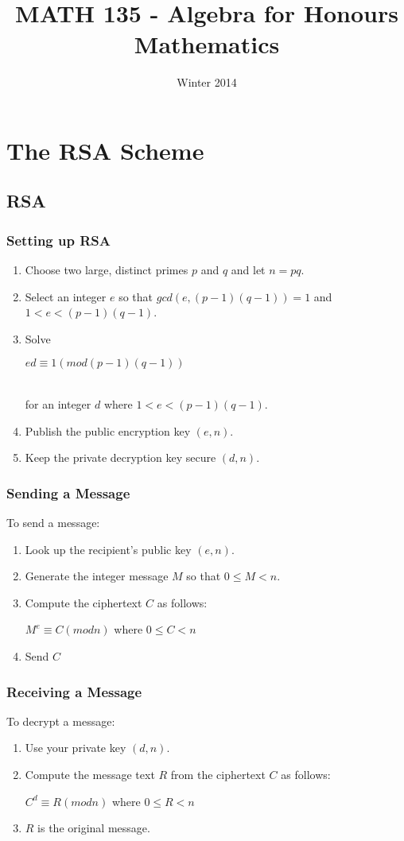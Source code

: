 \documentclass[12pt]{report}
\title{MATH 135 - Algebra for Honours Mathematics}
\author{}
\date{Winter 2014}
\begin{document}
\maketitle
\tableofcontents
\chapter{The RSA Scheme}
	\section{RSA}
		\subsection{Setting up RSA}
			\begin{enumerate}
				\item Choose two large, distinct primes $p$ and $q$ and let $n = pq$.
				\item Select an integer $e$ so that $gcd(e, (p-1)(q-1)) = 1$ and $1 < e < (p-1)(q-1)$. 
				\item Solve\\
				\centerline{$ed \equiv 1 (mod (p-1)(q-1))$}\\
				for an integer $d$ where $1 < e < (p-1)(q-1)$.
				\item Publish the public encryption key $(e,n)$.
				\item Keep the private decryption key secure $(d,n)$.
			\end{enumerate}
		\subsection{Sending a Message}
			To send a message:
			\begin{enumerate}
				\item Look up the recipient's public key $(e, n)$.
				\item Generate the integer message $M$ so that $0 \leq M < n$.
				\item Compute the ciphertext $C$ as follows:\\
					\centerline{$M^e\equiv C (mod n)$ where $0 \leq C < n$}
				\item Send $C$
			\end{enumerate}
		\subsection{Receiving a Message}
			To decrypt a message:
			\begin{enumerate}
				\item Use your private key $(d,n)$. 
				\item Compute the message text $R$ from the ciphertext $C$ as follows:\\
					\centerline{$C^d \equiv R (mod n)$ where $0 \leq R < n$}
				\item $R$ is the original message.
			\end{enumerate}
\end{document}
